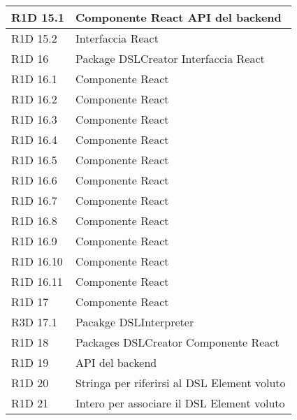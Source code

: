 \begin{center}
\begin{longtable}{ | l | p{8cm} |}
	R1D 15.1 & Componente React \newline API del backend \\ \hline

	R1D 15.2 & Interfaccia React \\ \hline

	R1D 16 & Package DSLCreator \newline Interfaccia React \\ \hline

	R1D 16.1 & Componente React \\ \hline

	R1D 16.2 & Componente React \\ \hline

	R1D 16.3 & Componente React \\ \hline	

	R1D 16.4 & Componente React \\ \hline

	R1D 16.5 & Componente React \\ \hline

	R1D 16.6 & Componente React \\ \hline

	R1D 16.7 & Componente React \\ \hline

	R1D 16.8 & Componente React \\ \hline

	R1D 16.9 & Componente React \\ \hline

	R1D 16.10 & Componente React \\ \hline

	R1D 16.11 & Componente React \\ \hline

	R1D 17 & Componente React \\ \hline 

	R3D 17.1 & Pacakge DSLInterpreter \\ \hline

	R1D 18 & Packages DSLCreator \newline Componente React \\ \hline

	R1D 19 & API del backend \\ \hline

	R1D 20 & Stringa per riferirsi al DSL Element voluto \\ \hline
 
	R1D 21 & Intero per associare il DSL Element voluto \\ \hline


\end{longtable}
\end{center}
